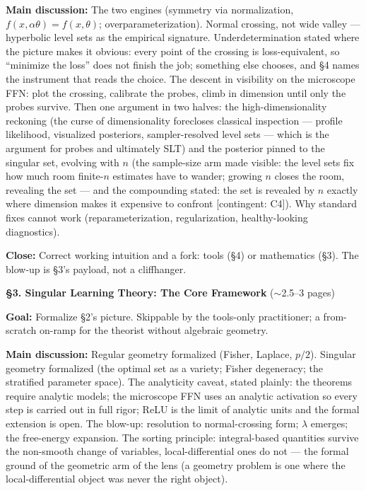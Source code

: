 \documentclass[11pt]{article}
\begin{document}
\textbf{Main discussion:} The two engines (symmetry via normalization,
$f(x,\alpha\theta)=f(x,\theta)$; overparameterization). Normal crossing,
not wide valley --- hyperbolic level sets as the empirical signature.
Underdetermination stated where the picture makes it obvious: every
point of the crossing is loss-equivalent, so ``minimize the loss'' does
not finish the job; something else chooses, and \S4 names the
instrument that reads the choice. The descent in visibility on the
microscope FFN: plot the crossing, calibrate the probes, climb in
dimension until only the probes survive. Then one argument in two
halves: the high-dimensionality reckoning (the curse of dimensionality
forecloses classical inspection --- profile likelihood, visualized
posteriors, sampler-resolved level sets --- which is the argument for
probes and ultimately SLT) and the posterior pinned to the singular set,
evolving with $n$ (the sample-size arm made visible: the level sets fix
how much room finite-$n$ estimates have to wander; growing $n$ closes
the room, revealing the set --- and the compounding stated: the set is
revealed by $n$ exactly where dimension makes it expensive to confront
[contingent: C4]). Why standard fixes cannot work (reparameterization,
regularization, healthy-looking diagnostics).

\textbf{Close:} Correct working intuition and a fork: tools (\S4) or
mathematics (\S3). The blow-up is \S3's payload, not a cliffhanger.

\bigskip

\noindent\textbf{\S3. Singular Learning Theory: The Core Framework}
($\sim$2.5--3 pages)

\textbf{Goal:} Formalize \S2's picture. Skippable by the tools-only
practitioner; a from-scratch on-ramp for the theorist without algebraic
geometry.

\textbf{Main discussion:} Regular geometry formalized (Fisher, Laplace,
$p/2$). Singular geometry formalized (the optimal set as a variety;
Fisher degeneracy; the stratified parameter space). The analyticity
caveat, stated plainly: the theorems require analytic models; the
microscope FFN uses an analytic activation so every step is carried out
in full rigor; ReLU is the limit of analytic units and the formal
extension is open. The blow-up: resolution to normal-crossing form;
$\lambda$ emerges; the free-energy expansion. The sorting principle:
integral-based quantities survive the non-smooth change of variables,
local-differential ones do not --- the formal ground of the geometric
arm of the lens (a geometry problem is one where the local-differential
object was never the right object).
\end{document}

